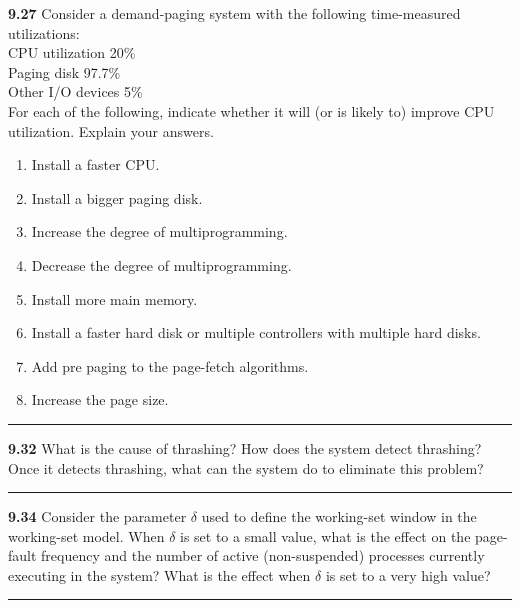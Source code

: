 \documentclass[12pt]{jhwhw}
\begin{document}
	\begin{addmargin}[1em]{}
	\end{addmargin}

\textbf{9.27}  
	Consider a demand-paging system with the following time-measured utilizations: \\
	CPU utilization 20\% \\
	Paging disk 97.7\% \\
	Other I/O devices 5\% \\
	For each of the following, indicate whether it will (or is likely to) improve
	CPU utilization. Explain your answers.
	\begin{enumerate}
		\item Install a faster CPU.
		\item Install a bigger paging disk.
		\item Increase the degree of multiprogramming.
		\item Decrease the degree of multiprogramming.
		\item Install more main memory.
		\item Install a faster hard disk or multiple controllers with multiple hard disks.
		\item Add pre paging to the page-fetch algorithms.
		\item Increase the page size.
	\end{enumerate}
\textcolor[RGB]{240,240,240}{\rule{\textwidth}{0.5pt}}\bigbreak

	\begin{addmargin}[1em]{}
	\end{addmargin}

\textbf{9.32}  
	What is the cause of thrashing? How does the system detect thrashing? Once it detects 
	thrashing, what can the system do to eliminate this problem?
\textcolor[RGB]{240,240,240}{\rule{\textwidth}{0.5pt}}\bigbreak

	\begin{addmargin}[1em]{}
	\end{addmargin}

\textbf{9.34}  
	Consider the parameter $\delta$ used to define the working-set window in the working-set model.
	When $\delta$ is set to a small value, what is the effect on the page-fault frequency and the number
	of active (non-suspended) processes currently executing in the system? What is the effect when $\delta$
	is set to a very high value?
\textcolor[RGB]{240,240,240}{\rule{\textwidth}{0.5pt}}\bigbreak

	\begin{addmargin}[1em]{}
	\end{addmargin}
\end{document}
